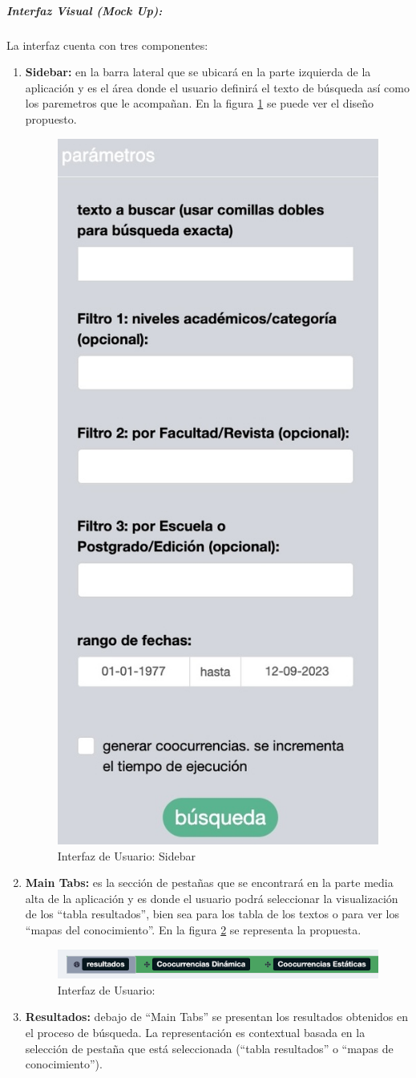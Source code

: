 \documentclass[
  12pt,
  openany]{book}
\begin{document}
\hypertarget{interfaz-visual-mock-up}{%
\subparagraph{Interfaz Visual (Mock Up):}\label{interfaz-visual-mock-up}}

La interfaz cuenta con tres componentes:

\begin{enumerate}
\def\labelenumi{\arabic{enumi}.}
\item
  \textbf{Sidebar:} en la barra lateral que se ubicará en la parte izquierda de la aplicación y es el área donde el usuario definirá el texto de búsqueda así como los paremetros que le acompañan. En la figura \ref{fig:sidebar2} se puede ver el diseño propuesto.

  \begin{figure}

  {\centering \includegraphics[width=0.2\linewidth]{images/05-desarrollo/4_ciclo/UI/sidebar} 

  }

  \caption{Interfaz de Usuario: Sidebar}\label{fig:sidebar2}
  \end{figure}
\item
  \textbf{Main Tabs:} es la sección de pestañas que se encontrará en la parte media alta de la aplicación y es donde el usuario podrá seleccionar la visualización de los ``tabla resultados'', bien sea para los tabla de los textos o para ver los ``mapas del conocimiento''. En la figura \ref{fig:maintab} se representa la propuesta.

  \begin{figure}

  {\centering \includegraphics[width=0.9\linewidth]{images/05-desarrollo/4_ciclo/UI/maintab} 

  }

  \caption{Interfaz de Usuario: }\label{fig:maintab}
  \end{figure}
\item
  \textbf{Resultados:} debajo de ``Main Tabs'' se presentan los resultados obtenidos en el proceso de búsqueda. La representación es contextual basada en la selección de pestaña que está seleccionada (``tabla resultados'' o ``mapas de conocimiento'').


\end{enumerate}
\end{document}
